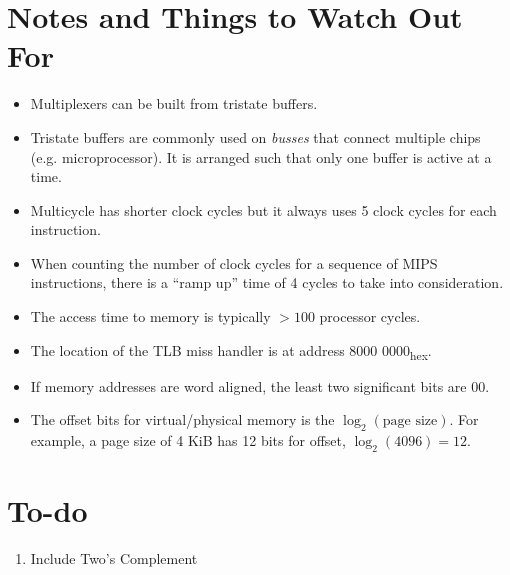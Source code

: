 \documentclass[12pt]{article}
\theoremstyle{definition}
\begin{document}
  \section{Notes and Things to Watch Out For}
  \begin{itemize}
    \item Multiplexers can be built from tristate buffers.
    \item Tristate buffers are commonly used on \emph{busses} that connect multiple chips (e.g. microprocessor).
    It is arranged such that only one buffer is active at a time.
    \item Multicycle has shorter clock cycles but it always uses 5 clock cycles for each instruction.
    \item When counting the number of clock cycles for a sequence of MIPS instructions, there is a ``ramp up'' time of 4 cycles to take into consideration.
    \item The access time to memory is typically $> 100$ processor cycles.
    \item The location of the TLB miss handler is at address 8000 0000\textsubscript{hex}.
    \item If memory addresses are word aligned, the least two significant bits are 00.
    \item The offset bits for virtual/physical memory is the $\log_2(\text{page size})$. For example, a page size of 4 KiB has 12 bits for offset, $\log_2(4096) = 12$.
  \end{itemize}

  \newpage
  \section{To-do}
  \begin{enumerate}
    \item Include Two's Complement
  \end{enumerate}
\end{document}
